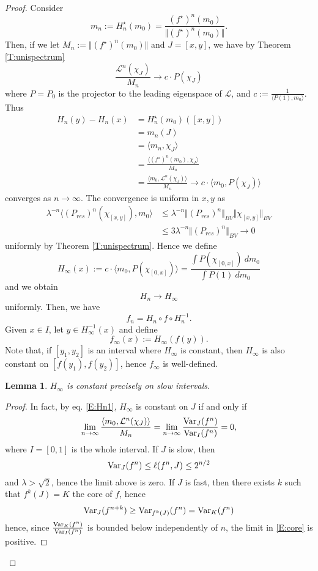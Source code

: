 \documentclass[11pt]{amsart}
\newtheorem{lemma}[theorem]{Lemma}
\begin{document}
\begin{proof}
Consider 
$$m_n := H_n^\star (m_0) = \frac{(f^\star)^n(m_0)}{\Vert (f^\star)^n(m_0) \Vert}.$$
Then, if we let $M_n := \Vert (f^\star)^n(m_0) \Vert$ and $J = [x, y]$, we have by Theorem \ref{T:unispectrum}
$$\frac{\mathcal{L}^n (\chi_J)}{M_n} \to c \cdot P(\chi_J)$$
where $P = P_0$ is the projector to the leading eigenspace of $\mathcal{L}$, and $c := \frac{1}{\langle P(1), m_0 \rangle}$.
Thus
\begin{align} \label{E:Hn}
H_n(y) - H_n(x) & = H_n^\star(m_0)([x, y]) \\
& = m_n(J) \\
& = \langle m_n, \chi_J \rangle \\
& = \frac{\langle (f^\star)^n(m_0), \chi_J \rangle}{M_n} \\
\label{E:Hn1}
& = \frac{\langle m_0, \mathcal{L}^n (\chi_J) \rangle}{M_n} \to c \cdot \langle m_0, P(\chi_J) \rangle
\end{align}
converges as $n \to \infty$. The convergence is uniform in $x, y$ as
\begin{align*} 
\lambda^{-n} \langle (P_{res})^n(\chi_{[x, y]}), m_0 \rangle &  \leq \lambda^{-n} \Vert (P_{res})^n \Vert_{BV} \Vert \chi_{[x, y]} \Vert_{BV} \\
&  \leq  3 \lambda^{-n} \Vert (P_{res})^n \Vert_{BV} \to 0
\end{align*}
uniformly by Theorem \ref{T:unispectrum}.  
Hence we define 
$$H_\infty(x) := c\cdot \langle m_0, P(\chi_{[0, x]}) \rangle = \frac{\int P(\chi_{[0, x]}) \ dm_0}{\int P(1) \ dm_0} $$
and we obtain 
$$H_n \to H_\infty$$
uniformly.
Then, we have 
$$f_n = H_n \circ f \circ H_n^{-1}.$$
Given $x \in I$, let $y \in H_\infty^{-1}(x)$ and define 
$$f_\infty(x) := H_{\infty}(f(y)).$$
Note that, if $[y_1, y_2]$ is an interval where $H_\infty$ is constant, then 
$H_\infty$ is also constant on $[f(y_1), f(y_2)]$, hence 
$f_\infty$ is well-defined.

\begin{lemma}
$H_\infty$ is constant precisely on slow intervals.
\end{lemma}

\begin{proof}
In fact, by eq. \eqref{E:Hn1}, $H_\infty$ is constant on $J$ if and only if  
\begin{equation} \label{E:core}
\lim_{n \to \infty} \frac{\langle m_0,  \mathcal{L}^n (\chi_J) \rangle}{M_n} = 
\lim_{n \to \infty} \frac{\textup{Var}_J (f^n)}{\textup{Var}_{I} (f^n)} = 0,
\end{equation}
where $I  = [0,1]$ is the whole interval. If $J$ is slow, then 
$$\textup{Var}_J (f^n) \leq \ell(f^n, J) \leq 2^{n/2}$$ 
and $\lambda > \sqrt{2}$, hence the limit above is zero. 
If $J$ is fast, then there exists $k$ such that $f^k(J) = K$ the core of $f$, hence 
$$\textup{Var}_J (f^{n+k}) \geq \textup{Var}_{f^k(J)} (f^{n}) = \textup{Var}_{K} (f^{n}) $$
hence, since 
$\frac{\textup{Var}_{K} (f^{n})}{\textup{Var}_{I} (f^{n})}$ is bounded below independently of $n$,
the limit in \eqref{E:core} is positive.
\end{proof}


\end{proof}
\end{document}
